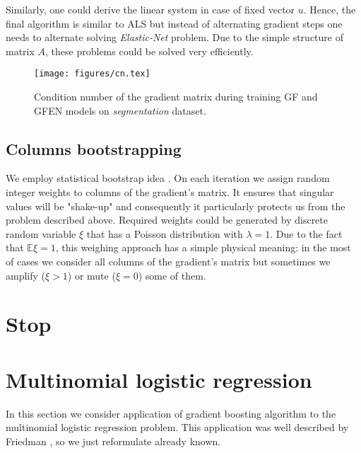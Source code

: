 \documentclass{article}
\begin{document}
Similarly, one could derive the linear system in case of fixed vector $u$. Hence, the final algorithm is similar to ALS but instead of alternating gradient steps one needs to alternate solving \emph{Elastic-Net} problem. Due to the simple structure of matrix $A$, these problems could be solved very efficiently.

\begin{figure}
\vskip 0.2in
\begin{center}
\centerline{\texttt{[image: figures/cn.tex]}}
\caption{Condition number of the gradient matrix during training GF and GFEN models on \emph{segmentation} dataset.}
\end{center}
\vskip -0.2in
\end{figure}

\subsection{Columns bootstrapping}
We employ statistical bootstrap idea \cite{Efron1992bootstrap}. On each iteration we assign random integer weights to columns of the gradient's matrix. It ensures that singular values will be "shake-up" and consequently it particularly protects us from the problem described above. Required weights could be generated by discrete random variable $\xi$ that has a Poisson distribution with $\lambda = 1$. Due to the fact that $\mathbb{E} \xi = 1$, this weighing approach has a simple physical meaning: in the most of cases we consider all columns of the gradient's matrix but sometimes we amplify ($\xi > 1$) or mute ($\xi = 0$) some of them.







\section{Stop}

\section{Multinomial logistic regression}
In this section we consider application of gradient boosting algorithm to the multinomial logistic regression problem. This application was well described by Friedman , so we just reformulate already known.
\end{document}
